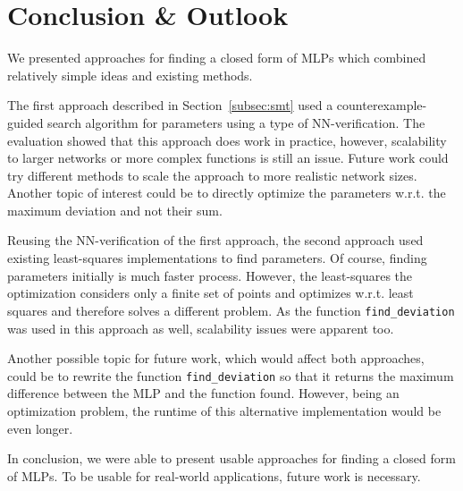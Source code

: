 \section{Conclusion \& Outlook}
\label{sec:con}
We presented approaches for finding a closed form of MLPs which combined relatively simple ideas and existing methods.\par
The first approach described in Section~\ref{subsec:smt} used a counterexample-guided search algorithm for parameters using a type of NN-verification. The evaluation showed that this approach does work in practice, however, scalability to larger networks or more complex functions is still an issue. Future work could try different methods to scale the approach to more realistic network sizes. Another topic of interest could be to directly optimize the parameters w.r.t. the maximum deviation and not their sum.\par %
Reusing the NN-verification of the first approach, the second approach used existing least-squares implementations to find parameters. Of course, finding parameters initially is much faster process. However, the least-squares the optimization considers only a finite set of points and optimizes w.r.t. least squares and therefore solves a different problem. As the function \lstinline{find_deviation} was used in this approach as well, scalability issues were apparent too.\par
Another possible topic for future work, which would affect both approaches, could be to rewrite the function \lstinline{find_deviation} so that it returns the maximum difference between the MLP and the function found. However, being an optimization problem, the runtime of this alternative implementation would be even longer.\par
In conclusion, we were able to present usable approaches for finding a closed form of MLPs. To be usable for real-world applications, future work is necessary.